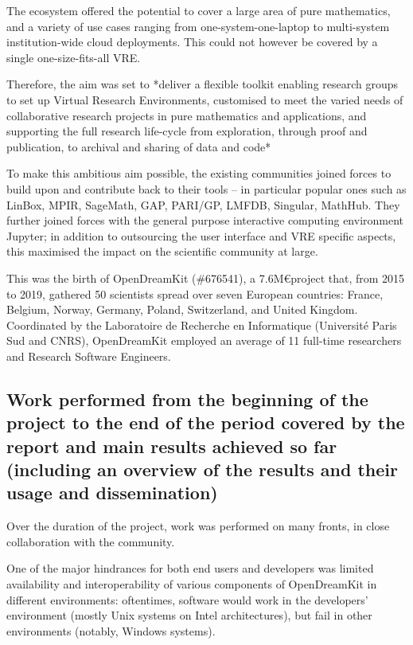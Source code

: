 The ecosystem offered the potential to cover a large area of pure mathematics, and a variety of use cases ranging from one-system-one-laptop to multi-system institution-wide cloud deployments. This could not however be covered by a single one-size-fits-all VRE.

Therefore, the aim was set to *deliver a flexible toolkit enabling research groups to set up Virtual Research Environments, customised to meet the varied needs of collaborative research projects in pure mathematics and applications, and supporting the full research life-cycle from exploration, through proof and publication, to archival and sharing of data and code*

To make this ambitious aim possible, the existing communities joined forces to build upon and contribute back to their tools -- in particular popular ones such as LinBox, MPIR, SageMath, GAP, PARI/GP, LMFDB, Singular, MathHub. They further joined forces with the general purpose interactive computing environment Jupyter; in addition to outsourcing the user interface and VRE specific aspects, this maximised the impact on the scientific community at large.

This was the birth of OpenDreamKit (\#676541), a 7.6M\euro project that, from 2015 to 2019, gathered 50 scientists spread over seven European countries: France, Belgium, Norway, Germany, Poland, Switzerland, and United Kingdom. Coordinated by the Laboratoire de Recherche en Informatique (Université Paris Sud and CNRS), OpenDreamKit employed an average of 11 full-time researchers and Research Software Engineers.

\subsection{Work performed from the beginning of the project to the end of the period covered by the report and main results achieved so far (including an overview of the results and their usage and dissemination)}

Over the duration of the project, work was performed on many fronts, in close collaboration with the community. 

One of the major hindrances for both end users and developers was limited availability and interoperability of various components of OpenDreamKit in different environments: oftentimes, software would work in the developers' environment (mostly Unix systems on Intel architectures), but fail in other environments (notably, Windows systems).

